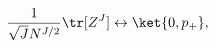 \begin{equation}\label{BMN-ground}
  \frac{1}{\sqrt{J}N^{J/2}}\tr[Z^J] \leftrightarrow \ket{0,p_{+}},
\end{equation}

